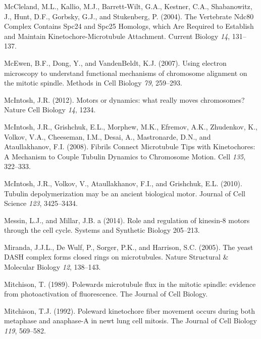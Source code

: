 \documentclass[12pt,a4paper,twoside,openright]{book}
\begin{document}
McCleland, M.L., Kallio, M.J., Barrett-Wilt, G.A., Kestner, C.A.,
Shabanowitz, J., Hunt, D.F., Gorbsky, G.J., and Stukenberg, P. (2004).
The Vertebrate Ndc80 Complex Contains Spc24 and Spc25 Homologs, which
Are Required to Establish and Maintain Kinetochore-Microtubule
Attachment. Current Biology \emph{14}, 131--137.

McEwen, B.F., Dong, Y., and VandenBeldt, K.J. (2007). Using electron
microscopy to understand functional mechanisms of chromosome alignment
on the mitotic spindle. Methods in Cell Biology \emph{79}, 259--293.

McIntosh, J.R. (2012). Motors or dynamics: what really moves
chromosomes? Nature Cell Biology \emph{14}, 1234.

McIntosh, J.R., Grishchuk, E.L., Morphew, M.K., Efremov, A.K.,
Zhudenkov, K., Volkov, V.A., Cheeseman, I.M., Desai, A., Mastronarde,
D.N., and Ataullakhanov, F.I. (2008). Fibrils Connect Microtubule Tips
with Kinetochores: A Mechanism to Couple Tubulin Dynamics to Chromosome
Motion. Cell \emph{135}, 322--333.

McIntosh, J.R., Volkov, V., Ataullakhanov, F.I., and Grishchuk, E.L.
(2010). Tubulin depolymerization may be an ancient biological motor.
Journal of Cell Science \emph{123}, 3425--3434.

Messin, L.J., and Millar, J.B. a (2014). Role and regulation of
kinesin-8 motors through the cell cycle. Systems and Synthetic Biology
205--213.

Miranda, J.J.L., De Wulf, P., Sorger, P.K., and Harrison, S.C. (2005).
The yeast DASH complex forms closed rings on microtubules. Nature
Structural \& Molecular Biology \emph{12}, 138--143.

Mitchison, T. (1989). Polewards microtubule flux in the mitotic spindle:
evidence from photoactivation of fluorescence. The Journal of Cell
Biology.

Mitchison, T.J. (1992). Poleward kinetochore fiber movement occurs
during both metaphase and anaphase-A in newt lung cell mitosis. The
Journal of Cell Biology \emph{119}, 569--582.
\end{document}
